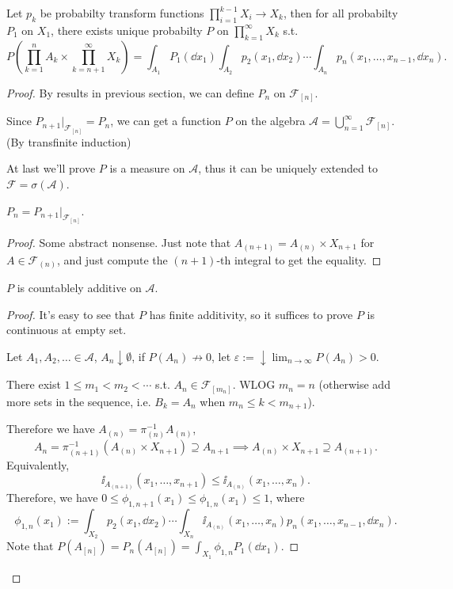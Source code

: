 \begin{theorem}[Tulcea]
    Let $p_k$ be probabilty transform functions $\prod_{i=1}^{k-1}X_i \to X_k$,
	then for all probabilty $P_1$ on $X_1$, there exists unique
	probabilty $P$ on $\prod_{k=1}^\infty X_k$ s.t.
	\[
	P\left(\prod_{k=1}^n A_k \times \prod_{k=n+1}^\infty X_k\right)
	= \int_{A_1}P_1(\dd x_1)\int_{A_2}p_2(x_1, \dd x_2) \cdots
	\int_{A_n} p_n(x_1, \dots, x_{n-1}, \dd x_n).
	\]
\end{theorem}
\begin{proof}[Proof]
    By results in previous section,
	we can define $P_n$ on $\mathscr{F}_{[n]}$.

	Since $P_{n+1}\big|_{\mathscr{F}_{[n]}} = P_n$, we can get
	a function $P$ on the
	algebra $\mathscr{A} = \bigcup_{n=1}^\infty \mathscr{F}_{[n]}$.
	(By transfinite induction)

	At last we'll prove $P$ is a measure on $\mathscr{A}$, thus it can be uniquely
	extended to $\mathscr{F} = \sigma(\mathscr{A})$.

	\begin{claim}
		$P_n = P_{n+1}\big|_{\mathscr{F}_{[n]}}$.
	\end{claim}
	\begin{proof}[Proof]
	    Some abstract nonsense. Just note that $A_{(n+1)} = A_{(n)} \times X_{n+1}$
		for $A \in \mathscr{F}_{(n)}$,
		and just compute the $(n+1)$-th integral to get the equality.
	\end{proof}

	\begin{claim}
	    $P$ is countablely additive on $\mathscr{A}$.
	\end{claim}
	\begin{proof}[Proof]
	    It's easy to see that $P$ has finite additivity,
		so it suffices to prove $P$ is continuous at empty set.

		Let  $A_1, A_2, \dots \in \mathscr{A}$, $A_n \downarrow \emptyset$,
		if  $P(A_n) \not\to 0$,
		let $\varepsilon := \downarrow \lim_{n\to \infty} P(A_n) > 0$.

		There exist $1\le m_1 < m_2 < \cdots$ s.t. $A_n \in \mathscr{F}_{[m_n]}$.
		WLOG $m_n = n$ (otherwise add more sets in the sequence, i.e.
		$B_k = A_n$ when $m_n \le k < m_{n+1}$).

		Therefore we have $A_{(n)} = \pi_{(n)}^{-1} A_{(n)}$,
		\[
		A_n = \pi_{(n+1)}^{-1}(A_{(n)} \times X_{n+1}) \supseteq A_{n+1}
		\implies A_{(n)} \times X_{n+1} \supseteq A_{(n+1)}.
		\]
		Equivalently,
		\[
		\ii_{A_{(n+1)}}(x_1,\dots, x_{n+1}) \le \ii_{A_{(n)}}(x_1,\dots, x_n).
		\]
		Therefore, we have $0\le \phi_{1,n+1}(x_1)\le \phi_{1, n}(x_1)\le 1$,
		where
		\[
		\phi_{1, n}(x_1) := \int_{X_2} p_2(x_1, \dd x_2)\cdots
		\int_{X_n}\ii_{A_{(n)}}(x_1,\dots,x_n) p_n(x_1,\dots,x_{n-1},\dd x_n).
		\]
		Note that $P(A_{[n]}) = P_n(A_{[n]}) = \int_{X_1}\phi_{1, n}P_1(\dd x_1)$.


\end{proof}
\end{proof}
